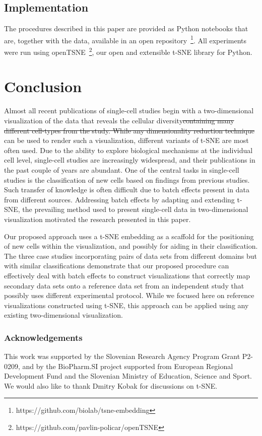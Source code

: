 \documentclass[runningheads]{llncs}
\providecommand{\DIFadd}[1]{{\protect\color{blue}\uwave{#1}}} %
\providecommand{\DIFdel}[1]{{\protect\color{red}\sout{#1}}}                      %
\providecommand{\DIFaddbegin}{} %
\providecommand{\DIFaddend}{} %
\providecommand{\DIFdelbegin}{} %
\providecommand{\DIFdelend}{} %
\newcommand{\DIFscaledelfig}{0.5}
\newlength{\DIFdelgraphicswidth} %
\newlength{\DIFdelgraphicsheight} %
\newcommand{\DIFaddincludegraphics}[2][]{{\color{blue}\fbox{\DIFOincludegraphics[#1]{#2}}}} %
\newcommand{\DIFdelincludegraphics}[2][]{%
\sbox{\DIFdelgraphicsbox}{\DIFOincludegraphics[#1]{#2}}%
\settoboxwidth{\DIFdelgraphicswidth}{\DIFdelgraphicsbox} %
\settoboxtotalheight{\DIFdelgraphicsheight}{\DIFdelgraphicsbox} %
\scalebox{\DIFscaledelfig}{%
\parbox[b]{\DIFdelgraphicswidth}{\usebox{\DIFdelgraphicsbox}\\[-\baselineskip] \rule{\DIFdelgraphicswidth}{0em}}\llap{\resizebox{\DIFdelgraphicswidth}{\DIFdelgraphicsheight}{%
\setlength{\unitlength}{\DIFdelgraphicswidth}%
\begin{picture}(1,1)%
\thicklines\linethickness{2pt} %
{\color[rgb]{1,0,0}\put(0,0){\framebox(1,1){}}}%
{\color[rgb]{1,0,0}\put(0,0){\line( 1,1){1}}}%
{\color[rgb]{1,0,0}\put(0,1){\line(1,-1){1}}}%
\end{picture}%
}\hspace*{3pt}}} %
} %
\DeclareRobustCommand{\DIFaddbegin}{\DIFOaddbegin \let\includegraphics\DIFaddincludegraphics} %
\DeclareRobustCommand{\DIFaddend}{\DIFOaddend \let\includegraphics\DIFOincludegraphics} %
\DeclareRobustCommand{\DIFdelbegin}{\DIFOdelbegin \let\includegraphics\DIFdelincludegraphics} %
\DeclareRobustCommand{\DIFdelend}{\DIFOaddend \let\includegraphics\DIFOincludegraphics} %
\begin{document}
\subsection{Implementation\label{sec:implementation}}

The procedures described in this paper are provided as Python notebooks that
are, together with the data, available in an open
repository~\footnote{https://github.com/biolab/tsne-embedding}. All experiments
were run using openTSNE~\footnote{https://github.com/pavlin-policar/openTSNE},
our open and extensible t-SNE library for Python.

\section{Conclusion}

Almost all recent publications of single-cell studies begin with a
two-dimensional visualization of the data that reveals the cellular diversity\DIFdelbegin \DIFdel{containing many 
different cell-types from the study. 
While any dimensionality reduction
technique }\DIFdelend \DIFaddbegin \DIFadd{. 
While most dimensionality reduction
techniques }\DIFaddend can be used to render such a visualization, different variants of
t-SNE are most often used. Due to the ability to explore biological mechanisms
at the individual cell level, single-cell studies are increasingly widespread, and
their publications in the past couple of years are abundant. One of the central
tasks in single-cell studies is the classification of new cells based on
findings from previous studies. Such transfer of knowledge is often difficult
due to batch effects present in data from different sources.
Addressing batch effects by adapting and extending t-SNE, the prevailing method used
to present single-cell data in two-dimensional visualization motivated the research
presented in this paper. 

Our proposed approach uses a t-SNE embedding as a scaffold for the positioning of
new cells within the visualization, and possibly for aiding in their
classification. The three case studies incorporating pairs of data sets from
different domains but with similar classifications demonstrate that our
proposed procedure can effectively deal with batch effects to construct
visualizations that correctly map secondary data sets onto a reference data
set from an independent study that possibly uses different experimental
protocol. While we focused here on reference visualizations constructed using t-SNE,
this approach can be applied using any existing two-dimensional visualization.

\subsubsection*{Acknowledgements}

This work was supported by the Slovenian Research Agency Program Grant P2-0209,
and by the BioPharm.SI project supported from European Regional Development
Fund and the Slovenian Ministry of Education, Science and Sport. We would also
like to thank Dmitry Kobak for discussions on t-SNE.

% 


\end{document}
